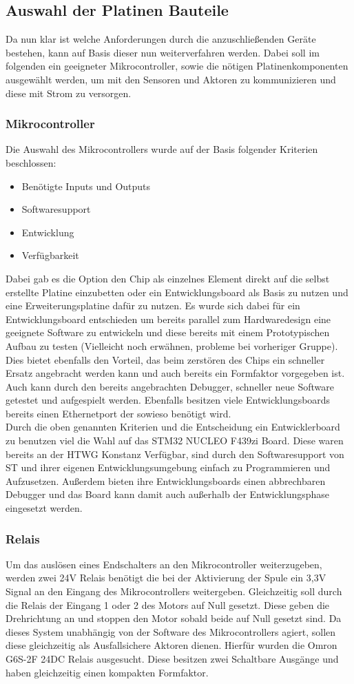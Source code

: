 \subsection{Auswahl der Platinen Bauteile}
Da nun klar ist welche Anforderungen durch die anzuschließenden Geräte bestehen, kann auf Basis dieser nun weiterverfahren werden. Dabei soll im folgenden ein geeigneter Mikrocontroller, sowie die nötigen Platinenkomponenten ausgewählt werden, um mit den Sensoren und Aktoren zu kommunizieren und diese mit Strom zu versorgen.
\subsubsection{Mikrocontroller}
Die Auswahl des Mikrocontrollers wurde auf der Basis folgender Kriterien beschlossen:
\begin{itemize}
	\item Benötigte Inputs und Outputs
	\item Softwaresupport 
	\item Entwicklung
	\item Verfügbarkeit
\end{itemize}
Dabei gab es die Option den Chip als einzelnes Element direkt auf die selbst erstellte Platine einzubetten oder ein Entwicklungsboard als Basis zu nutzen und eine Erweiterungsplatine dafür zu nutzen. Es wurde sich dabei für ein Entwicklungsboard entschieden um bereits parallel zum Hardwaredesign eine geeignete Software zu entwickeln und diese bereits mit einem Prototypischen Aufbau zu testen (Vielleicht noch erwähnen, probleme bei vorheriger Gruppe). Dies bietet ebenfalls den Vorteil, das beim zerstören des Chips ein schneller Ersatz angebracht werden kann und auch bereits ein Formfaktor vorgegeben ist. Auch kann durch den bereits angebrachten Debugger, schneller neue Software getestet und aufgespielt werden. Ebenfalls besitzen viele Entwicklungsboards bereits einen Ethernetport der sowieso benötigt wird.\\

\noindent Durch die oben genannten Kriterien und die Entscheidung ein Entwicklerboard zu benutzen viel die Wahl auf das STM32 NUCLEO F439zi Board. Diese waren bereits an der HTWG Konstanz Verfügbar, sind durch den Softwaresupport von ST und ihrer eigenen Entwicklungsumgebung einfach zu Programmieren und Aufzusetzen. Außerdem bieten ihre Entwicklungsboards einen abbrechbaren Debugger und das Board kann damit auch außerhalb der Entwicklungsphase eingesetzt werden.
\subsubsection{Relais}
Um das auslösen eines Endschalters an den Mikrocontroller weiterzugeben, werden zwei 24V Relais benötigt die bei der Aktivierung der Spule ein 3,3V Signal an den Eingang des Mikrocontrollers weitergeben. Gleichzeitig soll durch die Relais der Eingang 1 oder 2 des Motors auf Null gesetzt. Diese geben die Drehrichtung an und stoppen den Motor sobald beide auf Null gesetzt sind. Da dieses System unabhängig von der Software des Mikrocontrollers agiert, sollen diese gleichzeitig als Ausfallsichere Aktoren dienen. Hierfür wurden die Omron G6S-2F 24DC Relais ausgesucht. Diese besitzen zwei Schaltbare Ausgänge und haben gleichzeitig einen kompakten Formfaktor.
